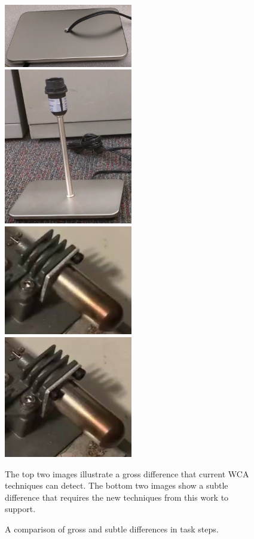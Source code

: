 \begin{figure}
  \includegraphics[width=0.5\textwidth]{figures/coarse_fine/lamp_base.png}
  \includegraphics[width=0.5\textwidth]{figures/coarse_fine/lamp_pipe.png}
  \includegraphics[width=0.5\textwidth]{figures/coarse_fine/stirling_1screw.png}
  \includegraphics[width=0.5\textwidth]{figures/coarse_fine/stirling_2screws.png}
  \begin{captiontext}
    The top two images illustrate a gross difference that current WCA techniques
    can detect.
    The bottom two images show a subtle difference that requires the new
    techniques from this work to support.
  \end{captiontext}
  \caption{
    A comparison of gross and subtle differences in task steps.
  }\label{fig:subtle_gross}
\end{figure}

